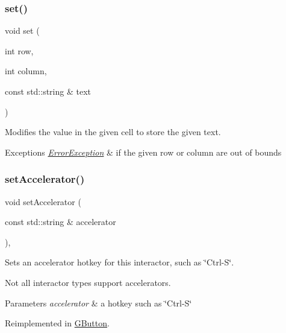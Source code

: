 \subsubsection{\texorpdfstring{set()}{set()}}
{\footnotesize\ttfamily void set (\begin{DoxyParamCaption}\item[{int}]{row,  }\item[{int}]{column,  }\item[{const std\+::string \&}]{text }\end{DoxyParamCaption})\hspace{0.3cm}{\ttfamily [virtual]}}



Modifies the value in the given cell to store the given text. 


\begin{DoxyExceptions}{Exceptions}
{\em \mbox{\hyperlink{classErrorException}{Error\+Exception}}} & if the given row or column are out of bounds \\
\hline
\end{DoxyExceptions}
\mbox{\label{classGInteractor_ad15f102f62e2960576012f1aa0ba4b2e}} 
\subsubsection{\texorpdfstring{set\+Accelerator()}{setAccelerator()}}
{\footnotesize\ttfamily void set\+Accelerator (\begin{DoxyParamCaption}\item[{const std\+::string \&}]{accelerator }\end{DoxyParamCaption})\hspace{0.3cm}{\ttfamily [virtual]}, {\ttfamily [inherited]}}



Sets an accelerator hotkey for this interactor, such as \char`\"{}\+Ctrl-\/\+S\char`\"{}. 

Not all interactor types support accelerators. 
\begin{DoxyParams}{Parameters}
{\em accelerator} & a hotkey such as \char`\"{}\+Ctrl-\/\+S\char`\"{} \\
\hline
\end{DoxyParams}


Reimplemented in \mbox{\hyperlink{classGButton_a5f78fc506a33b57dced42a419be34446}{G\+Button}}.

